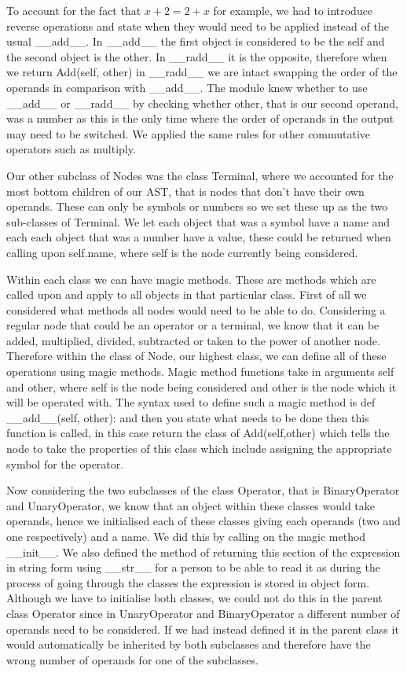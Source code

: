 \documentclass[12pt]{article}
\begin{document}
To account for the fact that $x + 2 = 2 + x$ for example, we had to introduce reverse operations and state when they would need to be applied instead of the usual \_\_add\_\_. In \_\_add\_\_ the first object is considered to be the self and the second object is the other. In \_\_radd\_\_ it is the opposite, therefore when we return Add(self, other) in \_\_radd\_\_ we are intact swapping the order of the operands in comparison with \_\_add\_\_. The module knew whether to use \_\_add\_\_ or \_\_radd\_\_ by checking whether other, that is our second operand, was a number as this is the only time where the order of operands in the output may need to be switched. We applied the same rules for other commutative operators such as multiply. 

Our other subclass of Nodes was the class Terminal, where we accounted for the most bottom children of our AST, that is nodes that don’t have their own operands. These can only be symbols or numbers so we set these up as the two sub-classes of Terminal. We let each object that was a symbol have a name and each each object that was a number have a value, these could be returned when calling upon self.name, where self is the node currently being considered. 

Within each class we can have magic methods. These are methods which are called upon and apply to all objects in that particular class. First of all we considered what methods all nodes would need to be able to do. Considering a regular node that could be an operator or a terminal, we know that it can be added, multiplied, divided, subtracted or taken to the power of another node. Therefore within the class of Node, our highest class, we can define all of these operations using magic methods. Magic method functions take in arguments self and other, where self is the node being considered and other is the node which it will be operated with. The syntax used to define such a magic method is def \_\_add\_\_(self, other): and then you state what needs to be done then this function is called, in this case return the class of Add(self,other) which tells the node to take the properties of this class which include assigning the appropriate symbol for the operator. 

Now considering the two subclasses of the class Operator, that is BinaryOperator and UnaryOperator, we know that an object within these classes would take operands, hence we initialised each of these classes giving each operands (two and one respectively) and a name. We did this by calling on the magic method \_\_init\_\_. We also defined the method of returning this section of the expression in string form using \_\_str\_\_ for a person to be able to read it as during the process of going through the classes the expression is stored in object form. Although we have to initialise both classes, we could not do this in the parent class Operator since in UnaryOperator and BinaryOperator a different number of operands need to be considered. If we had instead defined it in the parent class it would automatically be inherited by both subclasses and therefore have the wrong number of operands for one of the subclasses. 
\end{document}
